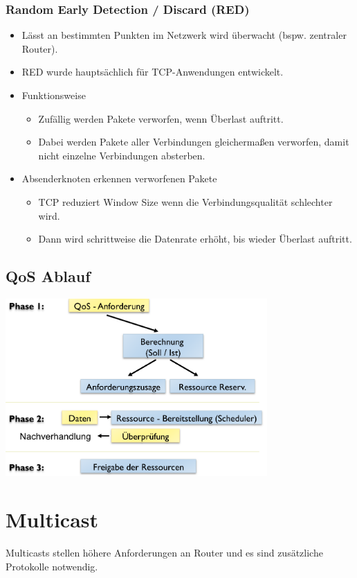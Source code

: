\documentclass{article} %
\begin{document}
\subsubsection{Random Early Detection / Discard (RED)}
	\begin{itemize}
	\item Lässt  an bestimmten Punkten im Netzwerk wird überwacht (bspw. zentraler Router). 
	\item RED wurde hauptsächlich für TCP-Anwendungen entwickelt. 
	\item Funktionsweise
		\begin{itemize}
		\item Zufällig werden Pakete verworfen, wenn Überlast auftritt.
		\item Dabei werden Pakete aller Verbindungen gleichermaßen verworfen, damit nicht einzelne Verbindungen \glqq absterben\grqq. 
		\end{itemize}
	\item Absenderknoten erkennen verworfenen Pakete 
		\begin{itemize}
			\item TCP reduziert Window Size wenn die Verbindungsqualität schlechter wird. 
			\item Dann wird schrittweise die Datenrate erhöht, bis wieder Überlast auftritt. 
		\end{itemize}
	\end{itemize}
	
\subsection{QoS Ablauf}	
\begin{center}
	\includegraphics[width=10cm]{img/QoSAblauf.png}
\end{center}

\section{Multicast}
\label{sec:muliticast}
Multicasts stellen höhere Anforderungen an Router und es sind zusätzliche Protokolle notwendig.
\end{document}
